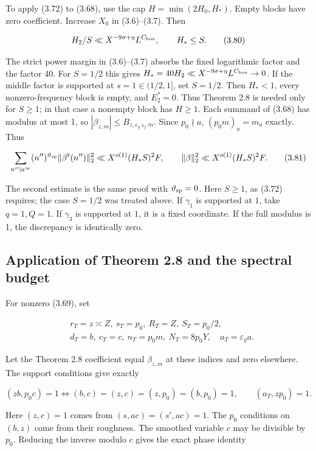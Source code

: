 To apply (3.72) to (3.68), use the cap
$H=\min(2H_0,H_*)$. Empty blocks have zero coefficient.
Increase $X_0$ in (3.6)--(3.7). Then

\[
H_2/S\ll X^{-9\sigma+\eta}L^{C_{\rm box}},\qquad H_*\le S.
\tag{3.80}
\]

The strict power margin in (3.6)--(3.7)
absorbs the fixed logarithmic factor and the factor 40.
For $S=1/2$ this gives
$H_*=40H_2\ll X^{-9\sigma+\eta}L^{C_{\rm box}}\to0$.
If the middle factor is supported at $s=1\in(1/2,1]$,
set $S=1/2$. Then $H_*<1$, every nonzero-frequency block is empty,
and $E_2^*=0$. Thus Theorem 2.8 is needed only for $S\ge1$;
in that case a nonempty block has $H\ge1$.
Each summand of (3.68) has modulus at most 1, so
$|\beta_{z,m}|\le B_{z,\varepsilon_y\varsigma_fm}$.
Since $p_0\nmid a$, $(p_0m)_a=m_a$ exactly. Thus

\[
\sum_{n''\mid a^\infty}(n'')^{\vartheta_{\rm sp}}
                 \|\beta^\flat(n'')\|_2^2
 \ll X^{o(1)}(H_*S)^2F,
\qquad\|\beta\|_2^2\ll X^{o(1)}(H_*S)^2F.
\tag{3.81}
\]

The second estimate is the same proof with $\vartheta_{\rm sp}=0$.
Here $S\ge1$, as (3.72) requires; the case $S=1/2$ was treated above.
If $\gamma_1$ is supported at $1$, take $q=1,Q=1$.
If $\gamma_3$ is supported at $1$, it is a fixed coordinate.
If the full modulus is 1, the discrepancy is identically zero.

\subsection{Application of Theorem 2.8 and the spectral budget}\label{sec:pi-spectral}

For nonzero (3.69), set

\[
\begin{aligned}
&r_T=z\asymp Z,\ s_T=p_0,\ R_T=Z,\ S_T=p_0/2,\quad\\
&d_T=b,\ c_T=c,\ n_T=p_0m,\ N_T=8p_0Y,
\quad a_T=\varepsilon_y a.
\end{aligned}
\tag{3.82}
\]

Let the Theorem 2.8 coefficient equal $\beta_{z,m}$ at these
indices and zero elsewhere. The support conditions give exactly

\[
(zb,p_0c)=1\iff
(b,c)=(z,c)=(z,p_0)=(b,p_0)=1,
\qquad(a_T,zp_0)=1.
\tag{3.83}
\]

Here $(z,c)=1$ comes from $(s,ac)=(s',ac)=1$.
The $p_0$ conditions on $(b,z)$ come from their roughness.
The smoothed variable $c$ may be divisible by $p_0$.
Reducing the inverse modulo $c$ gives the exact phase identity


